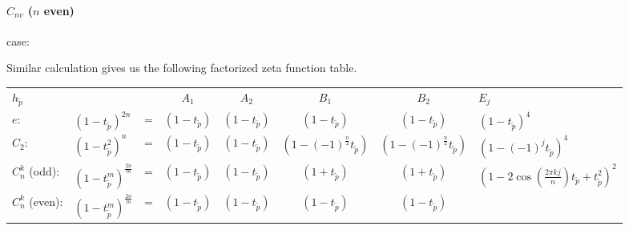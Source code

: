 \paragraph{$C_{nv}$ ($n$ even)} case:
%

Similar calculation gives us the following
factorized zeta function table.

\vskip 12pt
\begin{center}
  \begin{tabular}{b{1cm}lcccccl}

    $h_{\tilde p}$ &  & &  $A_1$  &  $A_2$  &  $B_1$  &  $B_2$  &  $E_{j}$  \\
    $e$:
                   & $(1-t_{\tilde p} )^{2n}$  &=&$(1-t_{\tilde p})$ & $(1-t_{\tilde p})$ &
                                                                                            $(1-t_{\tilde p})$ &$(1-t_{\tilde p})$&$ (1-t_{\tilde
                                                                                                                                    p})^4 $ \\
    $C_2$:
                   & $(1-t_{\tilde p}^2 )^n$ &=&  $(1-t_{\tilde p})$ & $(1-t_{\tilde p})$ &
                                                                                            $(1-(-1)^{\frac{n}{2}}t_{\tilde p})$ &$(1-(-1)^{\frac{n}{2}}t_{\tilde p})$ &
                                                                                                                                                                         $(1-(-1)^jt_{\tilde p})^4 $ \\
    $C_n^{k}$ (odd):
                   & $(1-t_{\tilde p}^m )^{\frac{2n}{m}}$ &=&  $(1-t_{\tilde p})$ & $(1-t_{\tilde p})$ &
                                                                                                         $(1+t_{\tilde p})$ &$(1+t_{\tilde p})$ &
                                                                                                                                                  $ (1-2\cos(\frac{2\pi kj}{n})t_{\tilde p}+t^{2}_{\tilde p})^2 $ \\
    $C_n^{k}$ (even):
                   & $(1-t_{\tilde p}^m )^{\frac{2n}{m}}$ &=&  $(1-t_{\tilde p})$ & $(1-t_{\tilde p})$ &
                                                                                                         $(1-t_{\tilde p})$ &$(1-t_{\tilde p})$ &

\end{tabular}
\end{center}
